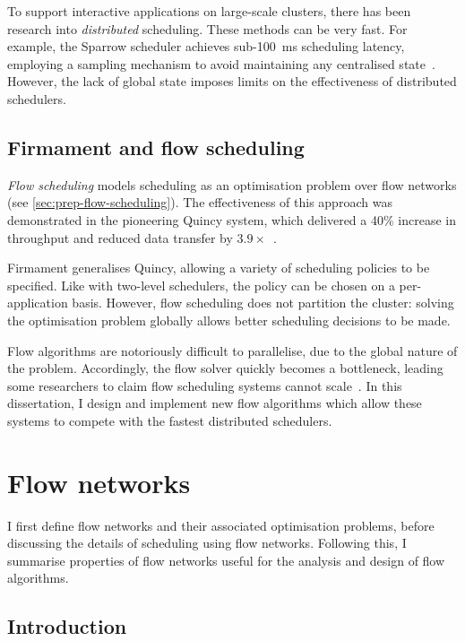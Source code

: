 To support interactive applications on large-scale clusters, there has been research into \emph{distributed} scheduling. These methods can be very fast. For example, the Sparrow scheduler achieves sub-\SI{100}{\milli\second} scheduling latency, employing a sampling mechanism to avoid maintaining any centralised state~\cite[fig.~10]{Ousterhout:2013}. However, the lack of global state imposes limits on the effectiveness of distributed schedulers.

\subsection{Firmament and flow scheduling}


\emph{Flow scheduling} models scheduling as an optimisation problem over flow networks (see \cref{sec:prep-flow-scheduling}). The effectiveness of this approach was demonstrated in the pioneering Quincy system, which delivered a 40\% increase in throughput and reduced data transfer by $3.9\times$~\cite{Isard:2009}. 

Firmament generalises Quincy, allowing a variety of scheduling policies to be specified. Like with two-level schedulers, the policy can be chosen on a per-application basis. However, flow scheduling does not partition the cluster: solving the optimisation problem globally allows better scheduling decisions to be made.

Flow algorithms are notoriously difficult to parallelise, due to the global nature of the problem. Accordingly, the flow solver quickly becomes a bottleneck, leading some researchers to claim flow scheduling systems cannot scale~\cite[\S6]{Boutin:2014}. In this dissertation, I design and implement new flow algorithms which allow these systems to compete with the fastest distributed schedulers.

\section{Flow networks} \label{sec:prep-flow}

I first define flow networks and their associated optimisation problems, before discussing the details of scheduling using flow networks. Following this, I summarise properties of flow networks useful for the analysis and design of flow algorithms.

\subsection{Introduction}

